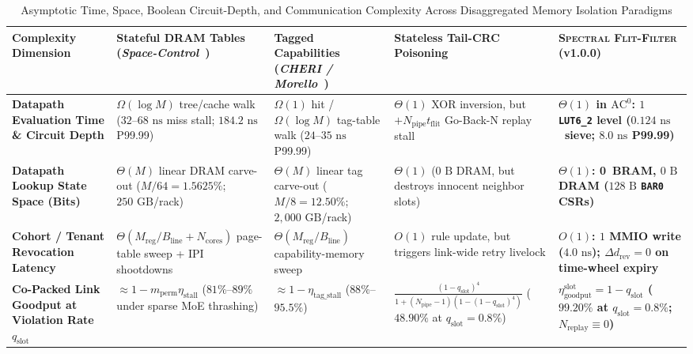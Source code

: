\documentclass[10pt,twocolumn]{article}
\providecommand{\ReleaseVersion}{v1.0.0}
\providecommand{\StageOneNs}{\ensuremath{0.124\text{~ns}}}
\providecommand{\CoreBRAM}{0}
\providecommand{\StageOneSieveDelayNs}{\StageOneNs}
\theoremstyle{spectralthm}
\begin{document}
\begin{table}[!tp]
\centering
\footnotesize
\setlength{\tabcolsep}{5.6pt}
\renewcommand{\arraystretch}{1.22}
\caption{Asymptotic Time, Space, Boolean Circuit-Depth, and Communication Complexity Across Disaggregated Memory Isolation Paradigms}
\label{tab:complexity}
\begin{tabularx}{\textwidth}{@{}>{\raggedright\hyphenpenalty=10000\arraybackslash}p{3.55cm} >{\raggedright\arraybackslash}X >{\raggedright\arraybackslash}X >{\raggedright\arraybackslash}X >{\raggedright\arraybackslash}X@{}}
\toprule
\textbf{Complexity Dimension} & \textbf{Stateful DRAM Tables (\textit{Space-Control}~\cite{goswami2026spacecontrol})} & \textbf{Tagged Capabilities (\textit{CHERI / Morello}~\cite{watson2015cheri})} & \textbf{Stateless Tail-CRC Poisoning} & \textbf{\textsc{Spectral Flit-Filter} (\ReleaseVersion)} \\
\midrule
\textbf{Datapath Evaluation Time \& Circuit Depth} & $\Omega(\log M)$ tree/cache walk ($32$--$68\text{~ns}$ miss stall; $184.2\text{~ns}$ P99.99) & $\Omega(1)$ hit / $\Omega(\log M)$ tag-table walk ($24$--$35\text{~ns}$ P99.99) & $\Theta(1)$ XOR inversion, but $+N_{\mathrm{pipe}} t_{\mathrm{flit}}$ Go-Back-N replay stall & \textbf{$\Theta(1)$ in $\mathrm{AC}^0$: $1$ \texttt{LUT6\_2} level (\StageOneSieveDelayNs\ sieve; $8.0\text{~ns}$ P99.99)} \\
\textbf{Datapath Lookup State Space (Bits)} & $\Theta(M)$ linear DRAM carve-out ($M/64 = 1.5625\%$; $250\text{~GB}$/rack) & $\Theta(M)$ linear tag carve-out ($M/8 = 12.50\%$; $2,000\text{~GB}$/rack) & $\Theta(1)$ ($0\text{~B}$ DRAM, but destroys innocent neighbor slots) & \textbf{$\Theta(1)$: \CoreBRAM\ BRAM, $0\text{~B}$ DRAM ($128\text{~B}$ \texttt{BAR0} CSRs)} \\
\textbf{Cohort / Tenant Revocation Latency} & $\Theta(M_{\mathrm{reg}}/B_{\mathrm{line}} + N_{\mathrm{cores}})$ page-table sweep + IPI shootdowns & $\Theta(M_{\mathrm{reg}}/B_{\mathrm{line}})$ capability-memory sweep & $O(1)$ rule update, but triggers link-wide retry livelock & \textbf{$O(1)$: $1$ MMIO write ($4.0\text{~ns}$); $\Delta d_{\mathrm{rev}} = 0$ on time-wheel expiry} \\
\textbf{Co-Packed Link Goodput at Violation Rate $q_{\mathrm{slot}}$} & $\approx 1 - m_{\mathrm{perm}}\eta_{\mathrm{stall}}$ ($81\%$--$89\%$ under sparse MoE thrashing) & $\approx 1 - \eta_{\mathrm{tag\_stall}}$ ($88\%$--$95.5\%$) & $\tfrac{(1 - q_{\mathrm{slot}})^4}{1 + (N_{\mathrm{pipe}}-1)(1 - (1 - q_{\mathrm{slot}})^4)}$ \newline ($48.90\%$ at $q_{\mathrm{slot}} = 0.8\%$) & \textbf{$\eta_{\mathrm{goodput}}^{\mathrm{slot}} = 1 - q_{\mathrm{slot}}$ ($99.20\%$ at $q_{\mathrm{slot}} = 0.8\%$; $N_{\mathrm{replay}} \equiv 0$)} \\

\end{tabularx}
\end{table}
\end{document}
